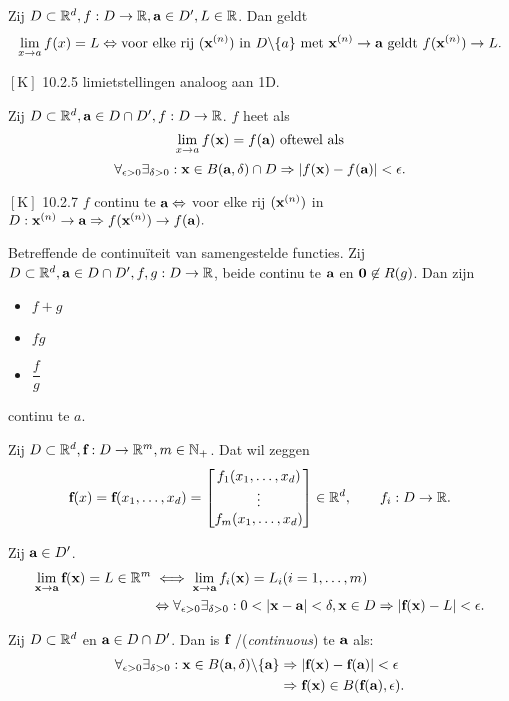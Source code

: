\documentclass{2wa40summary}
\begin{document}
	\theorem Zij $D \subset \mathbb{R}^d, f:D\rightarrow \mathbb{R}, {\textbf{a}} \in D', L \in \mathbb{R}$. Dan geldt
	\[ \lim_{x \rightarrow a} f(x)=L \Leftrightarrow \text{voor elke rij } ({\textbf{x}}^{(n)}) \text{ in } D\backslash\{a\} \text{ met } {\textbf{x}}^{(n)}\rightarrow {\textbf{a}} \text{ geldt } f({\textbf{x}}^{(n)}) \rightarrow L.\]
	
	\opm $\left[\text{K}\right]$ 10.2.5 limietstellingen analoog aan 1D.
	
	 Zij $D \subset \mathbb{R}^d, {\textbf{a}}\in D\cap D',f:D\rightarrow \mathbb{R}$. $f$ heet  als \[\lim_{x\rightarrow a}f({\textbf{x}})=f({\textbf{a}}) \text{ oftewel als}\]
	\[\forall _{\epsilon >0} \exists _{\delta >0}: \x \in B(\a,\delta)\cap D \Rightarrow |f(\x)-f(\a)|<\epsilon.\]
	
	\theorem $\left[\text{K}\right]$ 10.2.7
	$f$ continu te ${\textbf{a}}\Leftrightarrow$ voor elke rij $({\textbf{x}}^{(n)})$ in $D: {\textbf{x}}^{(n)}\rightarrow {\textbf{a}} \Rightarrow f({\textbf{x}}^{(n)}) \rightarrow f({\textbf{a}}).$
	
	\theorem Betreffende de continu\"iteit van samengestelde functies. Zij
	$D \subset \mathbb{R}^d, {\textbf{a}} \in D\cap D', f,g:D\rightarrow \mathbb{R}$, beide continu te ${\textbf{a}}$ en ${\textbf{0}} \not \in R(g)$.
	Dan zijn
	\begin{itemize}
		\item $f+g$
		\item $fg$
		\item $\dfrac{f}{g}$
	\end{itemize}
	continu te $a$.
	
	Zij $D \subset \mathbb{R}^d, {\textbf{f}}:D\rightarrow \mathbb{R}^m, m \in \mathbb{N}_+$. Dat wil zeggen
	\[{\textbf{f}}(x)={\textbf{f}}(x_1,\dots , x_d) =
	\begin{bmatrix}
	f_1(x_1,\dots , x_d) \\
	\vdots \\
	f_m(x_1,\dots , x_d) \\
	\end{bmatrix}\in\mathbb{R}^d, \qquad f_i:D\rightarrow \mathbb{R}.\]
	
	 Zij ${\textbf{a}} \in D'$.
	\begin{align*}
	\lim_{\x\to\a}\f(\x)=L \in \reals^m  &\iff \lim_{\x\to\a}f_i(\x)=L_i (i=1,\ldots ,m) \\
	&\Leftrightarrow \forall _{\epsilon >0} \exists _{\delta >0}: 0<|\x-\a|<\delta, \x\in D \Rightarrow \abs{\f(\x)-L}<\epsilon.
	\end{align*}
	
	 Zij $D \subset \mathbb{R}^d$ en ${\textbf{a}} \in D \cap D'$.
	Dan is ${\textbf{f}}$ /(\textit{continuous}) te ${\textbf{a}}$ als:
	\begin{align*}
	\forall _{\epsilon >0} \exists _{\delta >0}: \x\in B(\a,\delta)\backslash\set{\a} &\Rightarrow |\f(\x)-\f(\a)|<\epsilon \\
	&\Rightarrow \f(\x) \in B(\f(\a),\epsilon).
	\end{align*}
	
\end{document}
